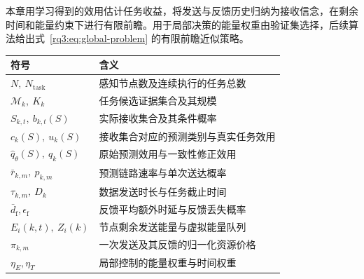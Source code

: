 本章用学习得到的效用估计任务收益，将发送与反馈历史归纳为接收信念，在剩余时间和能量约束下进行有限前瞻。用于局部决策的能量权重由验证集选择，后续算法给出式~\eqref{rq3:eq:global-problem} 的有限前瞻近似策略。

\begin{table}[t]
  \centering\small
  \label{rq3:tab:notation}
  \begin{tabularx}{\linewidth}{@{}lY@{}}
    \toprule
    符号 & 含义\\
    \midrule
    $N,\ N_{\mathrm{task}}$ & 感知节点数及连续执行的任务总数\\
    $\mathcal{M}_k,\ K_k$ & 任务候选证据集合及其规模\\
    $S_{k,t},\ b_{k,t}(S)$ & 实际接收集合及其条件概率\\
    $c_k(S),\ u_k(S)$ & 接收集合对应的预测类别与真实任务效用\\
    $\hat q_\theta(S),\ q_k(S)$ & 原始预测效用与一致性修正效用\\
    $\bar r_{k,m},\ p_{k,m}$ & 预测链路速率与单次送达概率\\
    $\tau_{k,m},\ D_k$ & 数据发送时长与任务截止时间\\
    $\bar d_{\mathrm f},\epsilon_{\mathrm f}$ & 反馈平均额外时延与反馈丢失概率\\
    $E_i(k,t),\ Z_i(k)$ & 节点剩余发送能量与虚拟能量队列\\
    $\pi_{k,m}$ & 一次发送及其反馈的归一化资源价格\\
    $\eta_E,\eta_T$ & 局部控制的能量权重与时间权重\\
    \bottomrule
  \end{tabularx}
\end{table}
\FloatBarrier
